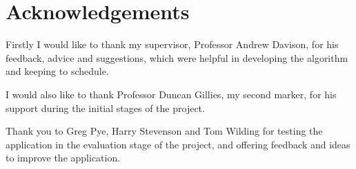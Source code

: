 \section*{Acknowledgements}

Firstly I would like to thank my supervisor, Professor Andrew Davison, for his feedback, advice and suggestions, which were helpful in developing the algorithm and keeping to schedule.

I would also like to thank Professor Duncan Gillies, my second marker, for his support during the initial stages of the project.

Thank you to Greg Pye, Harry Stevenson and Tom Wilding for testing the application in the evaluation stage of the project, and offering feedback and ideas to improve the application.